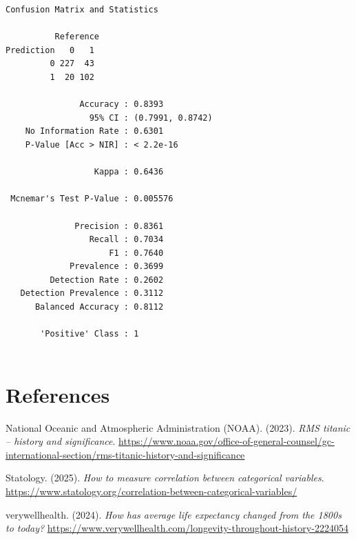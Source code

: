 \documentclass[
  letterpaper,
  DIV=11,
  numbers=noendperiod]{scrartcl}
\newlength{\cslhangindent}
\newenvironment{CSLReferences}[2] %
 {\begin{list}{}{%
  \setlength{\itemindent}{0pt}
  \setlength{\leftmargin}{0pt}
  \setlength{\parsep}{0pt}
  \ifodd #1
   \setlength{\leftmargin}{\cslhangindent}
   \setlength{\itemindent}{-1\cslhangindent}
  \fi
  \setlength{\itemsep}{#2\baselineskip}}}
 {\end{list}}
\begin{document}
\begin{verbatim}
Confusion Matrix and Statistics

          Reference
Prediction   0   1
         0 227  43
         1  20 102
                                          
               Accuracy : 0.8393          
                 95% CI : (0.7991, 0.8742)
    No Information Rate : 0.6301          
    P-Value [Acc > NIR] : < 2.2e-16       
                                          
                  Kappa : 0.6436          
                                          
 Mcnemar's Test P-Value : 0.005576        
                                          
              Precision : 0.8361          
                 Recall : 0.7034          
                     F1 : 0.7640          
             Prevalence : 0.3699          
         Detection Rate : 0.2602          
   Detection Prevalence : 0.3112          
      Balanced Accuracy : 0.8112          
                                          
       'Positive' Class : 1               
                                          
\end{verbatim}

\section*{References}\label{references}

\label{refs}
\begin{CSLReferences}{1}{0}
National Oceanic and Atmospheric Administration (NOAA). (2023).
\emph{RMS titanic -- history and significance}.
\url{https://www.noaa.gov/office-of-general-counsel/gc-international-section/rms-titanic-history-and-significance}

Statology. (2025). \emph{How to measure correlation between categorical
variables}.
\url{https://www.statology.org/correlation-between-categorical-variables/}

verywellhealth. (2024). \emph{How has average life expectancy changed
from the 1800s to today?}
\url{https://www.verywellhealth.com/longevity-throughout-history-2224054}

\end{CSLReferences}
\end{document}

